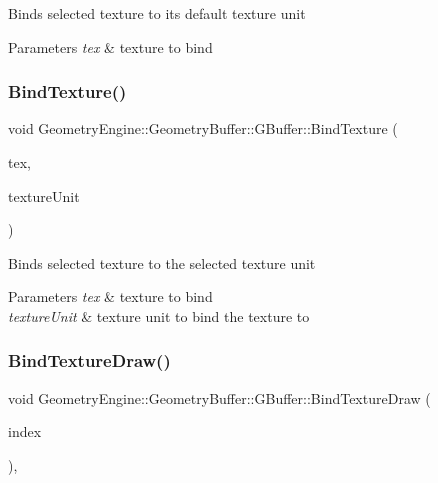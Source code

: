 Binds selected texture to its default texture unit 
\begin{DoxyParams}{Parameters}
{\em tex} & texture to bind \\
\hline
\end{DoxyParams}
\mbox{\label{class_geometry_engine_1_1_geometry_buffer_1_1_g_buffer_a3142603e5ce9519da6d4aba1d07fec1f}} 
\subsubsection{\texorpdfstring{BindTexture()}{BindTexture()}\hspace{0.1cm}{\footnotesize\ttfamily [4/4]}}
{\footnotesize\ttfamily void Geometry\+Engine\+::\+Geometry\+Buffer\+::\+G\+Buffer\+::\+Bind\+Texture (\begin{DoxyParamCaption}\item[{\mbox{\hyperlink{class_geometry_engine_1_1_geometry_buffer_1_1_g_buffer_a718dceafcac1915f7de061108597e1cc}{G\+B\+U\+F\+F\+E\+R\+\_\+\+T\+E\+X\+T\+U\+R\+E\+\_\+\+T\+Y\+PE}}}]{tex,  }\item[{unsigned int}]{texture\+Unit }\end{DoxyParamCaption})}

Binds selected texture to the selected texture unit 
\begin{DoxyParams}{Parameters}
{\em tex} & texture to bind \\
\hline
{\em texture\+Unit} & texture unit to bind the texture to \\
\hline
\end{DoxyParams}
\mbox{\label{class_geometry_engine_1_1_geometry_buffer_1_1_g_buffer_ab14f2b1778d7415674b67c3349392cc9}} 
\subsubsection{\texorpdfstring{BindTextureDraw()}{BindTextureDraw()}}
{\footnotesize\ttfamily void Geometry\+Engine\+::\+Geometry\+Buffer\+::\+G\+Buffer\+::\+Bind\+Texture\+Draw (\begin{DoxyParamCaption}\item[{unsigned int}]{index }\end{DoxyParamCaption})\hspace{0.3cm}{\ttfamily [override]}, {\ttfamily [virtual]}}

